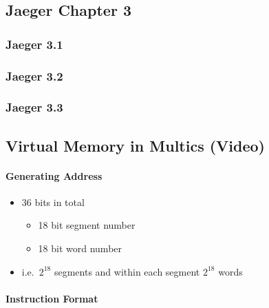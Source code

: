\documentclass[
  12pt]{findlay}
\providecommand{\tightlist}{%
  \setlength{\itemsep}{0pt}\setlength{\parskip}{0pt}}
\begin{document}
\hypertarget{jaeger-chapter-3}{%
\subsection{Jaeger Chapter 3}\label{jaeger-chapter-3}}

\hypertarget{jaeger-3.1}{%
\subsubsection{Jaeger 3.1}\label{jaeger-3.1}}

\hypertarget{jaeger-3.2}{%
\subsubsection{Jaeger 3.2}\label{jaeger-3.2}}

\hypertarget{jaeger-3.3}{%
\subsubsection{Jaeger 3.3}\label{jaeger-3.3}}

\hypertarget{virtual-memory-in-multics-video}{%
\subsection{Virtual Memory in Multics
(Video)}\label{virtual-memory-in-multics-video}}

\hypertarget{generating-address}{%
\paragraph{Generating Address}\label{generating-address}}

\begin{itemize}
\tightlist
\item
  36 bits in total

  \begin{itemize}
  \tightlist
  \item
    18 bit segment number
  \item
    18 bit word number
  \end{itemize}
\item
  i.e.~\(2^{18}\) segments and within each segment \(2^{18}\) words
\end{itemize}

\hypertarget{instruction-format}{%
\paragraph{Instruction Format}\label{instruction-format}}
\end{document}
